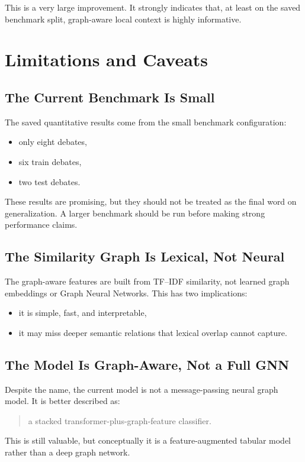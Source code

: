 \documentclass[11pt,a4paper]{article}
\begin{document}
This is a very large improvement. It strongly indicates that, at least on the saved benchmark split, graph-aware local context is highly informative.

\section{Limitations and Caveats}
\subsection{The Current Benchmark Is Small}
The saved quantitative results come from the small benchmark configuration:
\begin{itemize}[leftmargin=1.5em]
  \item only eight debates,
  \item six train debates,
  \item two test debates.
\end{itemize}

These results are promising, but they should not be treated as the final word on generalization. A larger benchmark should be run before making strong performance claims.

\subsection{The Similarity Graph Is Lexical, Not Neural}
The graph-aware features are built from TF--IDF similarity, not learned graph embeddings or Graph Neural Networks. This has two implications:
\begin{itemize}[leftmargin=1.5em]
  \item it is simple, fast, and interpretable,
  \item it may miss deeper semantic relations that lexical overlap cannot capture.
\end{itemize}

\subsection{The Model Is Graph-Aware, Not a Full GNN}
Despite the name, the current model is not a message-passing neural graph model. It is better described as:
\begin{quote}
a stacked transformer-plus-graph-feature classifier.
\end{quote}

This is still valuable, but conceptually it is a feature-augmented tabular model rather than a deep graph network.
\end{document}

